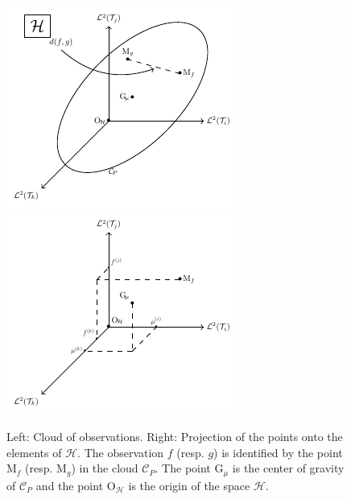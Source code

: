 \documentclass[times,sort&compress,3p]{elsarticle}
\theoremstyle{plain}%
\theoremstyle{definition}
\newcommand{\HH}{\mathcal{H}} %
\newcommand{\pobs}[1]{\mathrm{#1}} %
\newcommand{\Gmu}{\pobs{G}_{\!\mu}} %
\newcommand{\OH}{\pobs{O}_{\!\mathcal{H}}} %
\newcommand{\CP}{\mathcal{C}_{\!P}} %
\begin{document}
\begin{figure}
    \centering
    \includegraphics[scale=1.2]{cloud_obs.pdf}
    \includegraphics[scale=1.2]{cloud_obs_proj.pdf}
    \caption{Left: Cloud of observations. Right: Projection of the points onto the elements of $\HH$. The observation $f$ (resp. $g$) is identified by the point $\pobs{M}_f$ (resp. $\pobs{M}_g$) in the cloud $\CP$. The point $\Gmu$ is the center of gravity of $\CP$ and the point $\OH$ is the origin of the space $\HH$.}
    \label{fig:cloud_obs}
\end{figure}
\end{document}
